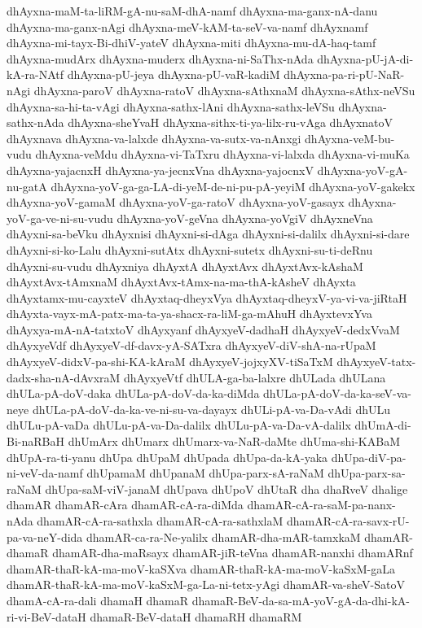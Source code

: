 {dhAyxna-maM-ta-liRM-gA-nu-saM-dhA-namf
dhAyxna-ma-ganx-nA-danu
dhAyxna-ma-ganx-nAgi
dhAyxna-meV-kAM-ta-seV-va-namf
dhAyxnamf
dhAyxna-mi-tayx-Bi-dhiV-yateV
dhAyxna-miti
dhAyxna-mu-dA-haq-tamf
dhAyxna-mudArx
dhAyxna-muderx
dhAyxna-ni-SaThx-nAda
dhAyxna-pU-jA-di-kA-ra-NAtf
dhAyxna-pU-jeya
dhAyxna-pU-vaR-kadiM
dhAyxna-pa-ri-pU-NaR-nAgi
dhAyxna-paroV
dhAyxna-ratoV
dhAyxna-sAthxnaM
dhAyxna-sAthx-neVSu
dhAyxna-sa-hi-ta-vAgi
dhAyxna-sathx-lAni
dhAyxna-sathx-leVSu
dhAyxna-sathx-nAda
dhAyxna-sheYvaH
dhAyxna-sithx-ti-ya-lilx-ru-vAga
dhAyxnatoV
dhAyxnava
dhAyxna-va-lalxde
dhAyxna-va-sutx-va-nAnxgi
dhAyxna-veM-bu-vudu
dhAyxna-veMdu
dhAyxna-vi-TaTxru
dhAyxna-vi-lalxda
dhAyxna-vi-muKa
dhAyxna-yajacnxH
dhAyxna-ya-jecnxVna
dhAyxna-yajocnxV
dhAyxna-yoV-gA-nu-gatA
dhAyxna-yoV-ga-ga-LA-di-yeM-de-ni-pu-pA-yeyiM
dhAyxna-yoV-gakekx
dhAyxna-yoV-gamaM
dhAyxna-yoV-ga-ratoV
dhAyxna-yoV-gasayx
dhAyxna-yoV-ga-ve-ni-su-vudu
dhAyxna-yoV-geVna
dhAyxna-yoVgiV
dhAyxneVna
dhAyxni-sa-beVku
dhAyxnisi
dhAyxni-si-dAga
dhAyxni-si-dalilx
dhAyxni-si-dare
dhAyxni-si-ko-Lalu
dhAyxni-sutAtx
dhAyxni-sutetx
dhAyxni-su-ti-deRnu
dhAyxni-su-vudu
dhAyxniya
dhAyxtA
dhAyxtAvx
dhAyxtAvx-kAshaM
dhAyxtAvx-tAmxnaM
dhAyxtAvx-tAmx-na-ma-thA-kAsheV
dhAyxta
dhAyxtamx-mu-cayxteV
dhAyxtaq-dheyxVya
dhAyxtaq-dheyxV-ya-vi-va-jiRtaH
dhAyxta-vayx-mA-patx-ma-ta-ya-shacx-ra-liM-ga-mAhuH
dhAyxtevxYva
dhAyxya-mA-nA-tatxtoV
dhAyxyanf
dhAyxyeV-dadhaH
dhAyxyeV-dedxVvaM
dhAyxyeVdf
dhAyxyeV-df-davx-yA-SATxra
dhAyxyeV-diV-shA-na-rUpaM
dhAyxyeV-didxV-pa-shi-KA-kAraM
dhAyxyeV-jojxyXV-tiSaTxM
dhAyxyeV-tatx-dadx-sha-nA-dAvxraM
dhAyxyeVtf
dhULA-ga-ba-lalxre
dhULada
dhULana
dhULa-pA-doV-daka
dhULa-pA-doV-da-ka-diMda
dhULa-pA-doV-da-ka-seV-va-neye
dhULa-pA-doV-da-ka-ve-ni-su-va-dayayx
dhULi-pA-va-Da-vAdi
dhULu
dhULu-pA-vaDa
dhULu-pA-va-Da-dalilx
dhULu-pA-va-Da-vA-dalilx
dhUmA-di-Bi-naRBaH
dhUmArx
dhUmarx
dhUmarx-va-NaR-daMte
dhUma-shi-KABaM
dhUpA-ra-ti-yanu
dhUpa
dhUpaM
dhUpada
dhUpa-da-kA-yaka
dhUpa-diV-pa-ni-veV-da-namf
dhUpamaM
dhUpanaM
dhUpa-parx-sA-raNaM
dhUpa-parx-sa-raNaM
dhUpa-saM-viV-janaM
dhUpava
dhUpoV
dhUtaR
dha
dhaRveV
dhalige
dhamAR
dhamAR-cAra
dhamAR-cA-ra-diMda
dhamAR-cA-ra-saM-pa-nanx-nAda
dhamAR-cA-ra-sathxla
dhamAR-cA-ra-sathxlaM
dhamAR-cA-ra-savx-rU-pa-va-neY-dida
dhamAR-ca-ra-Ne-yalilx
dhamAR-dha-mAR-tamxkaM
dhamAR-dhamaR
dhamAR-dha-maRsayx
dhamAR-jiR-teVna
dhamAR-nanxhi
dhamARnf
dhamAR-thaR-kA-ma-moV-kaSXva
dhamAR-thaR-kA-ma-moV-kaSxM-gaLa
dhamAR-thaR-kA-ma-moV-kaSxM-ga-La-ni-tetx-yAgi
dhamAR-va-sheV-SatoV
dhamA-cA-ra-dali
dhamaH
dhamaR
dhamaR-BeV-da-sa-mA-yoV-gA-da-dhi-kA-ri-vi-BeV-dataH
dhamaR-BeV-dataH
dhamaRH
dhamaRM
}
